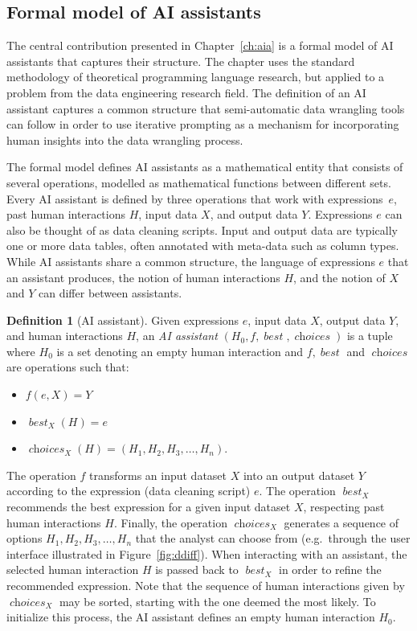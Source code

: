 \documentclass[fleqn,11pt]{report}
\newcommand{\Din}{X}
\newcommand{\Dout}{Y}
\DeclareMathOperator{\choices}{\mathit{choices}}
\DeclareMathOperator{\best}{\mathit{best}}
\theoremstyle{definition}
\newtheorem{definition}{Definition}
\newenvironment{nitemize}
{ \vspace{-0.4em}
  \begin{itemize}
    \setlength{\itemsep}{5pt}
    \setlength{\parskip}{0pt}
    \setlength{\parsep}{0pt} }
{ \end{itemize}
  \vspace{-0.4em} }
\begin{document}
\subsection{Formal model of AI assistants}

The central contribution presented in Chapter~\ref{ch:aia} is a formal model of AI assistants
that captures their structure. The chapter uses the standard methodology of theoretical
programming language research, but applied to a problem from the data engineering research field.
The definition of an AI assistant captures a common structure that semi-automatic data wrangling
tools can follow in order to use iterative prompting as a mechanism for incorporating human
insights into the data wrangling process.

The formal model defines AI assistants as a mathematical entity that consists of several
operations, modelled as mathematical functions between different sets.
Every AI assistant is defined by three operations that work with expressions~$e$, past human
interactions $H$, input data $\Din$, and output data $\Dout$. Expressions $e$ can also be
thought of as data cleaning scripts. Input and output data are typically one or more data
tables, often annotated with meta-data such as column types.
While AI assistants share a common structure, the language of expressions $e$ that an assistant
produces, the notion of human interactions $H$, and the notion of $\Din$ and $\Dout$ can differ
between assistants.

\begin{definition}[AI assistant]
\label{def:aia}
Given expressions $e$, input data $\Din$, output data $\Dout$, and human interactions $H$, an
\emph{AI assistant} $(H_0, f, \best, \choices)$ is a tuple where
$H_0$ is a set denoting an empty human interaction and
$f, \best$ and $\choices$ are operations such that:
%
\begin{nitemize}
\item $f(e,\Din) = \Dout$
\item $\best_{\Din}(H) = e$
\item $\choices_{\Din}(H) = (H_1,H_2,H_3,\ldots,H_n)$.
\end{nitemize}
\end{definition}

The operation $f$ transforms an input dataset $\Din$ into an output dataset $\Dout$ according to the
expression (data cleaning script) $e$. The operation $\best_{\Din}$ recommends the best expression
for a given input dataset $\Din$, respecting past human interactions $H$. Finally, the operation
$\choices_{\Din}$ generates a sequence of options $H_1, H_2, H_3, \ldots, H_n$ that the
analyst can choose from (e.g.~through the user interface illustrated in Figure~\ref{fig:ddiff}).
When interacting with an assistant, the selected human interaction $H$ is passed back to
$\best_\Din$ in order to refine the recommended expression. Note that the sequence of human
interactions given by $\choices_{\Din}$ may be sorted, starting with the one deemed the most
likely. To initialize this process, the AI assistant defines an empty human interaction $H_0$.
\end{document}
